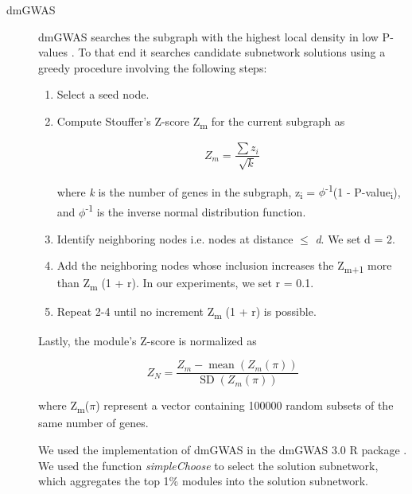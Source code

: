 \documentclass[twocolumn, 10pt]{article}
\begin{document}
\begin{description}
\item[{dmGWAS}] dmGWAS searches the subgraph with the highest local density in low P-values \cite{jia_dmgwas:_2011}. To that end it searches candidate subnetwork solutions using a greedy procedure involving the following steps:

\begin{enumerate}
\item Select a seed node.
\item Compute Stouffer's Z-score Z\textsubscript{m} for the current subgraph as

\begin{equation*} 
Z_m = \frac{\sum z_i}{\sqrt{k}}
\end{equation*}

where \emph{k} is the number of genes in the subgraph, z\textsubscript{i} = \(\phi\)\textsuperscript{-1}(1 - P-value\textsubscript{i}), and \(\phi\)\textsuperscript{-1} is the inverse normal distribution function.
\item Identify neighboring nodes i.e. nodes at distance \(\le\) \emph{d}. We set d = 2.
\item Add the neighboring nodes whose inclusion increases the Z\textsubscript{m+1} more than Z\textsubscript{m} \texttimes{} (1 + r). In our experiments, we set r = 0.1.
\item Repeat 2-4 until no increment Z\textsubscript{m} \texttimes{} (1 + r) is possible.
\end{enumerate}

Lastly, the module's Z-score is normalized as

\begin{equation*}
Z_{N}=\frac{Z_{m}-\operatorname{mean}\left(Z_{m}(\pi)\right)}{\operatorname{SD}\left(Z_{m}(\pi)\right)}
\end{equation*} 

where Z\textsubscript{m}(\(\pi\)) represent a vector containing 100000 random subsets of the same number of genes.

We used the implementation of dmGWAS in the dmGWAS 3.0 R package \cite{dmgwas}. We used the function \emph{simpleChoose} to select the solution subnetwork, which aggregates the top 1\% modules into the solution subnetwork.
\end{description}
\end{document}
